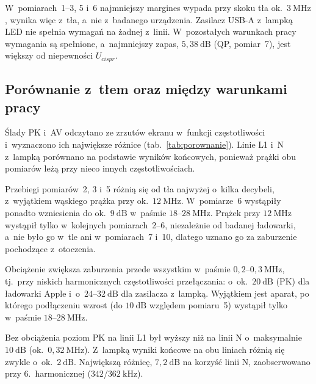\documentclass[11pt,a4paper]{article}
\begin{document}
W~pomiarach~1--3, 5 i~6 najmniejszy margines wypada przy skoku tła ok.~$3\ \mathrm{MHz}$, wynika
więc z~tła, a~nie z~badanego urządzenia. Zasilacz USB-A z~lampką LED nie spełnia wymagań na
żadnej z~linii. W~pozostałych warunkach pracy wymagania są spełnione, a~najmniejszy zapas,
$5{,}38\ \mathrm{dB}$ (QP, pomiar~7), jest większy od niepewności $U_{cispr}$.

\subsection{Porównanie z~tłem oraz między warunkami pracy}
\label{sec:porownanie}

Ślady PK i~AV odczytano ze zrzutów ekranu w~funkcji częstotliwości i~wyznaczono ich największe
różnice (tab.~\ref{tab:porownanie}). Linie L1 i~N z~lampką porównano na podstawie wyników
końcowych, ponieważ prążki obu pomiarów leżą przy nieco innych częstotliwościach.

Przebiegi pomiarów~2, 3 i~5 różnią się od tła najwyżej o~kilka decybeli, z~wyjątkiem
wąskiego prążka przy ok.~$12\ \mathrm{MHz}$. W~pomiarze~6 wystąpiły ponadto wzniesienia do
ok.~$9\ \mathrm{dB}$ w~paśmie $18$--$28\ \mathrm{MHz}$. Prążek przy $12\ \mathrm{MHz}$ wystąpił tylko
w~kolejnych pomiarach~2--6, niezależnie od badanej ładowarki, a~nie było go w~tle ani
w~pomiarach~7 i~10, dlatego uznano go za zaburzenie pochodzące z~otoczenia.

Obciążenie zwiększa zaburzenia przede wszystkim w~paśmie $0{,}2$--$0{,}3\ \mathrm{MHz}$, tj.\ przy
niskich harmonicznych częstotliwości przełączania: o~ok.~$20\ \mathrm{dB}$ (PK) dla ładowarki
Apple i~o~$24$--$32\ \mathrm{dB}$ dla zasilacza z~lampką. Wyjątkiem jest aparat, po którego
podłączeniu wzrost (do $10\ \mathrm{dB}$ względem pomiaru~5) wystąpił tylko w~paśmie $18$--$28\ \mathrm{MHz}$.

Bez obciążenia poziom PK na linii L1 był wyższy niż na linii N o~maksymalnie $10\ \mathrm{dB}$
(ok.~$0{,}32\ \mathrm{MHz}$). Z~lampką wyniki końcowe na obu liniach różnią się zwykle
o~ok.~$2\ \mathrm{dB}$. Największą różnicę, $7{,}2\ \mathrm{dB}$ na korzyść linii N,
zaobserwowano przy 6.~harmonicznej ($342$/$362\ \mathrm{kHz}$).
\end{document}
